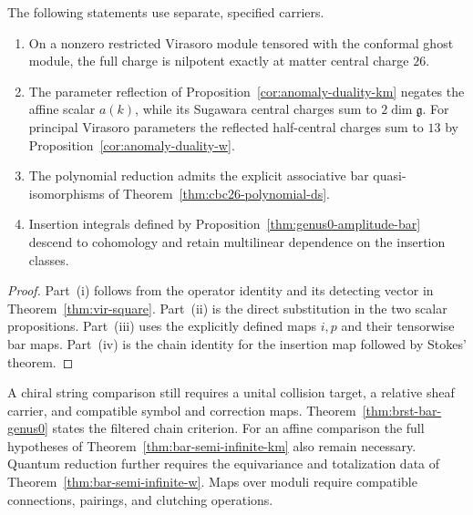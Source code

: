 \begin{proposition}
\label{thm:algebraic-string-dictionary}
The following statements use separate, specified carriers.
\begin{enumerate}[label=\textup{(\roman*)}]
\item On a nonzero restricted Virasoro module tensored with the conformal ghost module, the full charge is nilpotent exactly at matter central charge $26$.
\item The parameter reflection of Proposition~\ref{cor:anomaly-duality-km} negates the affine scalar $a(k)$, while its Sugawara central charges sum to $2\dim\mathfrak g$.
For principal Virasoro parameters the reflected half-central charges sum to $13$ by Proposition~\ref{cor:anomaly-duality-w}.
\item The polynomial reduction admits the explicit associative bar quasi-isomorphisms of Theorem~\ref{thm:cbc26-polynomial-ds}.
\item Insertion integrals defined by Proposition~\ref{thm:genus0-amplitude-bar} descend to cohomology and retain multilinear dependence on the insertion classes.
\end{enumerate}
\end{proposition}

\begin{proof}
Part~(i) follows from the operator identity and its detecting vector in Theorem~\ref{thm:vir-square}.
Part~(ii) is the direct substitution in the two scalar propositions.
Part~(iii) uses the explicitly defined maps $i,p$ and their tensorwise bar maps.
Part~(iv) is the chain identity for the insertion map followed by Stokes' theorem.
\end{proof}

A chiral string comparison still requires a unital collision target, a relative sheaf carrier, and compatible symbol and correction maps.
Theorem~\ref{thm:brst-bar-genus0} states the filtered chain criterion.
For an affine comparison the full hypotheses of Theorem~\ref{thm:bar-semi-infinite-km} also remain necessary.
Quantum reduction further requires the equivariance and totalization data of Theorem~\ref{thm:bar-semi-infinite-w}.
Maps over moduli require compatible connections, pairings, and clutching operations.

